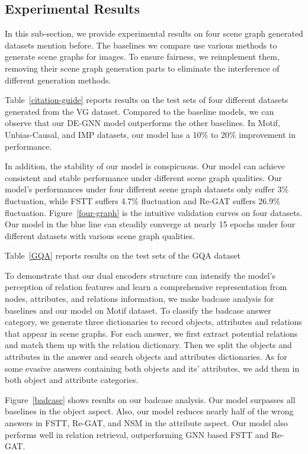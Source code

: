 \documentclass[letterpaper]{article} %
\begin{document}
\subsection{Experimental Results}
In this sub-section, we provide experimental results on four scene graph generated datasets mention before. The baselines we compare  use various methods to generate scene graphs for images. To ensure fairness, we reimplement them, removing their scene graph generation parts to eliminate the interference of different generation methods.

Table~\ref{citation-guide} reports results on the test sets of four different datasets generated from the VG dataset. Compared to the baseline models, we can observe that our DE-GNN model outperforms the other baselines. In Motif, Unbias-Causal, and IMP datasets, our model has a 10\% to 20\% improvement in performance.

In addition, the stability of our model is conspicuous. Our model can achieve consistent and stable performance under different scene graph qualities. Our model's performances under four different scene graph datasets only suffer 3\% fluctuation,
while FSTT suffers 4.7\% fluctuation and Re-GAT suffers 26.9\% fluctuation. Figure~\ref{four-graph} is the intuitive validation curves on four datasets. Our model in the blue line can steadily converge at nearly 15 epochs under four different datasets with various scene graph qualities. 

Table~\ref{GQA} reports results on the test sets of the GQA dataset

To demonstrate that our dual encoders structure can intensify the model's perception of relation features and learn a comprehensive representation from nodes, attributes, and relations information, we make badcase analysis for baselines and our model on Motif dataset. To classify the badcase answer category, we generate three dictionaries to record objects, attributes and relations that appear in scene graphs. For each answer, we first extract potential relations and match them up with the relation dictionary. Then we split the objects and attributes in the answer and search objects and attributes dictionaries. As for some evasive answers containing both objects and its' attributes, we add them in both object and attribute categories. 

Figure~\ref{badcase} shows results on our badcase analysis. Our model surpasses all baselines in the object aspect. Also, our model reduces nearly half of the wrong answers in FSTT, Re-GAT, and NSM in the attribute aspect. Our model also performs well in relation retrieval, outperforming GNN based FSTT and Re-GAT.
\end{document}
